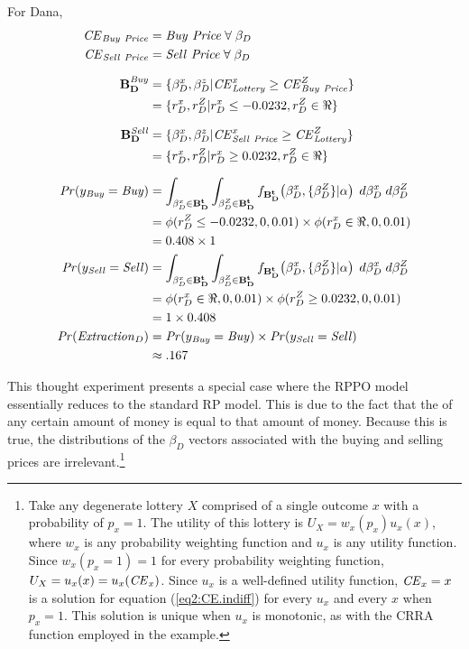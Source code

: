 \documentclass[../main.tex]{subfiles}
\begin{document}
\noindent For Dana,
\begin{align}
	\begin{split}
		{\ensuremath{\mathit{CE}}}_{\mathit{Buy\ Price}} &= \mathit{Buy\ Price} \;\forall\; \beta_D\\
		{\mathit{CE}}_{\mathit{Sell\ Price}} &= \mathit{Sell\ Price} \;\forall\; \beta_D\\[1.5ex]
		\mathbf{B_D^{\mathit{Buy}}} &= \{ \beta_D^x,\beta_D^z | {\mathit{CE}}_{\mathit{Lottery}}^x \geq {\ensuremath{\mathit{CE}}}_{\mathit{Buy\ Price}}^Z \}\\
		&= \{ r_D^x,r_D^Z | r_D^x \leq -0.0232, r_D^Z \in \Re\}\\[1.5ex]
		\mathbf{B_D^{\mathit{Sell}}} &= \{ \beta_D^x,\beta_D^z | {\mathit{CE}}_{\mathit{Sell\ Price}}^x \geq {\ensuremath{\mathit{CE}}}_{\mathit{Lottery}}^Z \}\\
		&= \{ r_D^x,r_D^Z | r_D^x \geq 0.0232, r_D^Z \in \Re\}\\[1.5ex]
		{\ensuremath{\mathit{Pr}}}(y_{\mathit{Buy}} = \mathit{Buy}) &= \int_{\beta_D^x \in \mathbf{B^t_D}}\int_{\beta_D^Z \in \mathbf{B^t_D}} f_{\mathbf{B^t_D}}\!\left(\beta_D^x,\{\beta_D^Z\}|\alpha\right) \;d\beta_D^x \; d\beta_D^Z\\
		&= \phi(r_D^Z \leq -0.0232,0,0.01) \times \phi(r_D^x \in \Re,0,0.01)\\
		&= 0.408 \times 1\\
		{\mathit{Pr}}(y_{\mathit{Sell}} = \mathit{Sell}) &= \int_{\beta_D^x \in \mathbf{B^t_D}}\int_{\beta_D^Z \in \mathbf{B^t_D}} f_{\mathbf{B^t_D}}\!\left(\beta_D^x,\{\beta_D^Z\}|\alpha\right) \;d\beta_D^x \; d\beta_D^Z\\
		&= \phi(r_D^x \in \Re,0,0.01) \times \phi(r_D^Z \geq 0.0232,0,0.01)\\
		&= 1 \times 0.408\\
	{\mathit{Pr}}(\mathit{Extraction}_D) &= {\mathit{Pr}}(y_{\mathit{Buy}} = \mathit{Buy}) \times {\ensuremath{\mathit{Pr}}}(y_{\mathit{Sell}} = \mathit{Sell})\\
	&\approx .167
	\end{split}
\end{align}

This thought experiment presents a special case where the RPPO model essentially reduces to the standard RP model.
This is due to the fact that the {\CE} of any certain amount of money is equal to that amount of money.
Because this is true, the distributions of the $\beta_D$ vectors associated with the buying and selling prices are irrelevant.\footnote{
	Take any degenerate lottery $X$ comprised of a single outcome $x$ with a probability of $p_x =1$.
	The utility of this lottery is $U_X = w_x( p_x )u_x(x )$, where $w_x$ is any probability weighting function and $u_x$ is any utility function.
	Since $w_x(p_x=1)=1$ for every probability weighting function, $U_X=u_x(x)=u_x({\mathit{CE}}_x)$.
	Since $u_x$ is a well-defined utility function, ${\mathit{CE}}_x=x$ is a solution for equation (\ref{eq2:CE.indiff}) for every $u_x$ and every $x$ when $p_x=1$.
	This solution is unique when $u_x$ is monotonic, as with the CRRA function employed in the example.
} 
\end{document}
